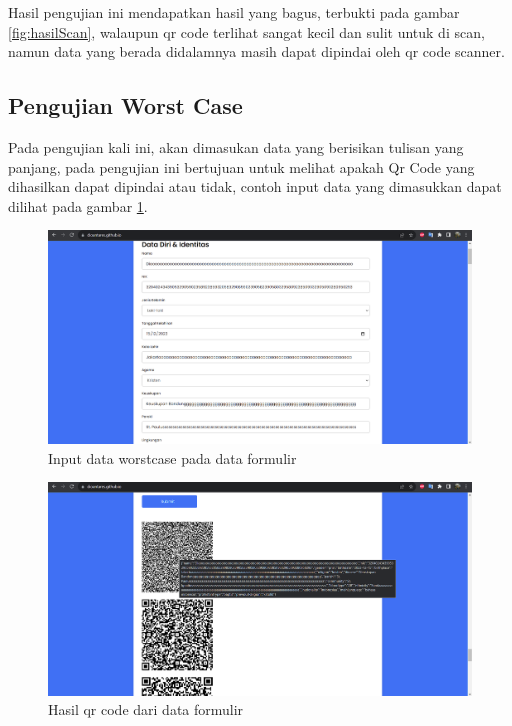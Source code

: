 Hasil pengujian ini mendapatkan hasil yang bagus, terbukti pada gambar \ref{fig:hasilScan}, walaupun qr code terlihat sangat kecil dan sulit untuk di scan, namun data yang berada didalamnya masih dapat dipindai oleh qr code scanner.

\subsection{Pengujian Worst Case}
\label{sec:pengujianWorst}

Pada pengujian kali ini, akan dimasukan data yang berisikan tulisan yang panjang, pada pengujian ini bertujuan untuk melihat apakah Qr Code yang dihasilkan dapat dipindai atau tidak, contoh input data yang dimasukkan dapat dilihat pada gambar \ref{fig:inputWorstCase}.

\begin{figure}[H]
	\centering
	\includegraphics[scale=0.4]{Gambar/inputWorstCase.png}
	\caption{Input data worstcase pada data formulir} 
	\label{fig:inputWorstCase}
\end{figure}

\begin{figure}[H]
	\centering
	\includegraphics[scale=0.4]{Gambar/qrCodeWorstCase.png}
	\caption{Hasil qr code dari data formulir} 
	\label{fig:qrCodeWorstCase}
\end{figure}


